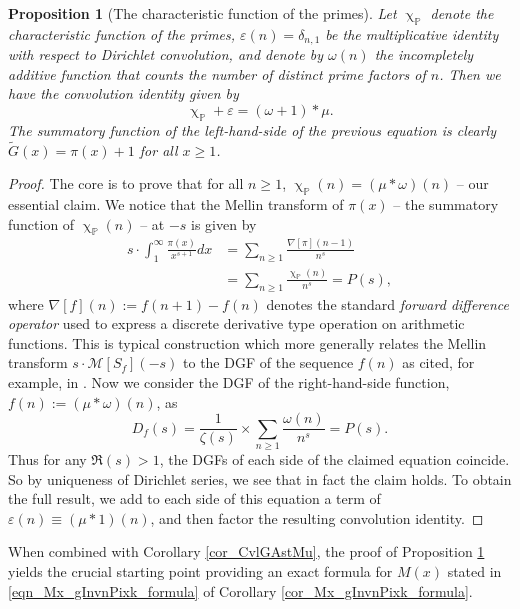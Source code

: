 \documentclass[11pt,reqno,a4letter]{article}
\numberwithin{figure}{section}
\numberwithin{table}{section}
\renewcommand{\chi}{\upchi}
\theoremstyle{plain}
\newtheorem{prop}[theorem]{Proposition}
\numberwithin{theorem}{section}
\theoremstyle{definition}
\begin{document}
\begin{prop}[The characteristic function of the primes] 
\label{prop_AntiqueDivisorSumIdent} 
Let $\chi_{\mathbb{P}}$ denote the characteristic function of the primes, 
$\varepsilon(n) = \delta_{n,1}$ be the multiplicative identity with respect to Dirichlet convolution, 
and denote by $\omega(n)$ the incompletely additive function that counts the number of 
distinct prime factors of $n$. 
Then we have the convolution identity given by 
$$\chi_{\mathbb{P}} + \varepsilon = (\omega + 1) \ast \mu.$$ 
The summatory function of the left-hand-side of the previous equation is 
clearly $\widetilde{G}(x) = \pi(x)+1$ for all $x \geq 1$. 
\end{prop}
\begin{proof} 
The core is to prove that for all $n \geq 1$, 
$\chi_{\mathbb{P}}(n) = (\mu \ast \omega)(n)$ -- our essential claim. 
We notice that the Mellin transform of $\pi(x)$ -- the summatory function of 
$\chi_{\mathbb{P}}(n)$ -- at $-s$ is given by 
\begin{align*} 
s \cdot \int_1^{\infty} \frac{\pi(x)}{x^{s+1}} dx & = \sum_{n \geq 1} \frac{\nabla[\pi](n-1)}{n^s} \\ 
     & = \sum_{n \geq 1} \frac{\chi_{\mathbb{P}}(n)}{n^s} = P(s), 
\end{align*} 
where $\nabla[f](n) := f(n+1) - f(n)$ denotes the standard 
\emph{forward difference operator} used to express a discrete derivative type operation on 
arithmetic functions. 
This is typical construction which more generally relates the Mellin transform 
$s \cdot \mathcal{M}[S_f](-s)$ to the 
DGF of the sequence $f(n)$ as cited, for example, in \cite[\S 11]{APOSTOLANUMT}. Now we consider the 
DGF of the right-hand-side function, $f(n) := (\mu \ast \omega)(n)$, as 
\[
D_f(s) = \frac{1}{\zeta(s)} \times \sum_{n \geq 1} \frac{\omega(n)}{n^s} = P(s).  
\]
Thus for any $\Re(s) > 1$, the DGFs of each side of the 
claimed equation coincide. So by uniqueness of Dirichlet series, we see that in fact the claim 
holds. To obtain the full result, we add to each side of this equation a term of 
$\varepsilon(n) \equiv (\mu \ast 1)(n)$, and then factor the resulting convolution identity. 
\end{proof} 

When combined with Corollary \ref{cor_CvlGAstMu}, the 
proof of Proposition \ref{prop_AntiqueDivisorSumIdent} yields the crucial 
starting point providing an exact 
formula for $M(x)$ stated in \eqref{eqn_Mx_gInvnPixk_formula} of 
Corollary \ref{cor_Mx_gInvnPixk_formula}. 
\end{document}
